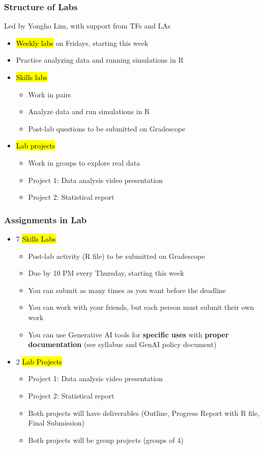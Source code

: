 \documentclass[slidestop,compress,mathserif]{beamer}
\begin{document}

\begin{frame}
	\frametitle{Structure of Labs} 
	Led by Yongho Lim, with support from TFs and LAs
	\begin{itemize}
		\item \hl{Weekly labs} on Fridays, starting this week
		\item Practice analyzing data and running simulations in R
		\item \hl{Skills labs}
		\begin{itemize}
			\item Work in pairs
			\item Analyze data and run simulations in R
			\item Post-lab questions to be submitted on Gradescope
		\end{itemize}
		\item \hl{Lab projects}
		\begin{itemize}
			\item Work in groups to explore real data
			\item Project 1: Data analysis video presentation
			\item Project 2: Statistical report
		\end{itemize}
	\end{itemize}
\end{frame}


\begin{frame}
	\frametitle{Assignments in Lab}
	\begin{itemize}
		\item 7 \hl{Skills Labs}
			\begin{itemize}
				\item Post-lab activity (R file) to be submitted on Gradescope
				\item Due by 10 PM every Thursday, starting this week
				\item You can submit as many times as you want before the deadline
				\item You can work with your friends, but each person must submit their own work
				\item You can use Generative AI tools for \textbf{specific uses} with \textbf{proper documentation} (see syllabus and GenAI policy document)
			\end{itemize}
		\item 2 \hl{Lab Projects}	
			\begin{itemize}
				\item Project 1: Data analysis video presentation
				\item Project 2: Statistical report
				\item Both projects will have deliverables (Outline, Progress Report with R file, Final Submission)
				\item Both projects will be group projects (groups of 4)
			\end{itemize}
	\end{itemize}
\end{frame}
\end{document}
